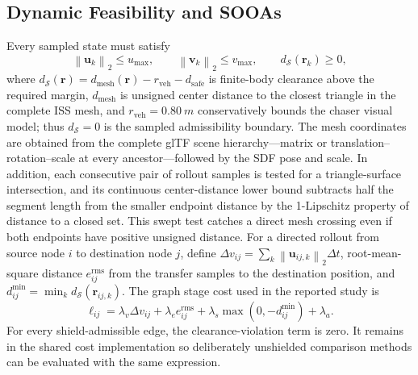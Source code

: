 \documentclass{IEEEtaes}
\newcommand{\dt}{\Delta t}
\newcommand{\norm}[1]{\left\lVert #1 \right\rVert}
\newcommand{\unit}[2]{#1~#2}
\theoremstyle{remark}
\theoremstyle{plain}
\begin{document}
\subsection{Dynamic Feasibility and SOOAs}

Every sampled state must satisfy
\begin{equation}
  \norm{\mathbf u_k}_2\le u_{\max},\qquad
  \norm{\mathbf v_k}_2\le v_{\max},\qquad
  d_{\mathcal S}(\mathbf r_k)\ge 0,
  \label{eq:limits}
\end{equation}
where $d_{\mathcal S}(\mathbf r)=d_{\mathrm{mesh}}(\mathbf r)-r_{\mathrm{veh}}-d_{\mathrm{safe}}$ is finite-body clearance above the required margin, $d_{\mathrm{mesh}}$ is unsigned center distance to the closest triangle in the complete ISS mesh, and $r_{\mathrm{veh}}=\unit{0.80}{m}$ conservatively bounds the chaser visual model; thus $d_{\mathcal S}=0$ is the sampled admissibility boundary. The mesh coordinates are obtained from the complete glTF scene hierarchy---matrix or translation--rotation--scale at every ancestor---followed by the SDF pose and scale. In addition, each consecutive pair of rollout samples is tested for a triangle-surface intersection, and its continuous center-distance lower bound subtracts half the segment length from the smaller endpoint distance by the 1-Lipschitz property of distance to a closed set. This swept test catches a direct mesh crossing even if both endpoints have positive unsigned distance. For a directed rollout from source node $i$ to destination node $j$, define $\Delta v_{ij}=\sum_k\norm{\mathbf u_{ij,k}}_2\dt$, root-mean-square distance $e_{ij}^{\mathrm{rms}}$ from the transfer samples to the destination position, and $d_{ij}^{\min}=\min_k d_{\mathcal S}(\mathbf r_{ij,k})$. The graph stage cost used in the reported study is
\begin{equation}
  \ell_{ij}=\lambda_v\Delta v_{ij}+\lambda_e e_{ij}^{\mathrm{rms}}+\lambda_s\max(0,-d_{ij}^{\min})+\lambda_a.
  \label{eq:edge-cost}
\end{equation}
For every shield-admissible edge, the clearance-violation term is zero. It remains in the shared cost implementation so deliberately unshielded comparison methods can be evaluated with the same expression.
\end{document}
